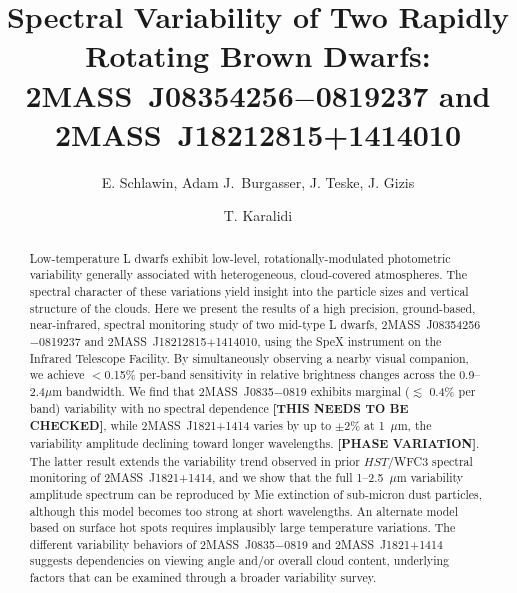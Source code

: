\documentclass[twocolumn]{aastex6}
\begin{document}
\title{Spectral Variability of Two Rapidly Rotating Brown Dwarfs: \\2MASS~J08354256$-$0819237 and 2MASS~J18212815+1414010}


\author{E. Schlawin, Adam J.\ Burgasser, J. Teske, J. Gizis \and T. Karalidi}



\begin{abstract}
Low-temperature L dwarfs exhibit low-level, rotationally-modulated photometric variability generally associated with heterogeneous, cloud-covered atmospheres. The spectral character of these variations yield insight into the particle sizes and vertical structure of the clouds. Here we present the results of a high precision, ground-based, near-infrared, spectral monitoring study of two mid-type L dwarfs, 2MASS~J08354256$-$0819237 and 2MASS~J18212815+1414010, using the SpeX instrument on the Infrared Telescope Facility. By simultaneously observing a nearby visual companion, we achieve $<$0.15\% per-band sensitivity in relative brightness changes across the 0.9--2.4$\mu$m bandwidth. We find that 2MASS~J0835$-$0819 exhibits marginal ($\lesssim$ 0.4\% per band) variability with no spectral dependence {\bf [THIS NEEDS TO BE CHECKED]}, while 2MASS~J1821+1414 varies by up to $\pm$2\% at 1~$\mu$m, the variability amplitude declining toward longer wavelengths.  {\bf [PHASE VARIATION]}. The latter result extends the variability trend observed in prior $HST$/WFC3 spectral monitoring of 2MASS~J1821+1414, and we show that the full 1--2.5~$\mu$m variability amplitude spectrum can be reproduced by Mie extinction of sub-micron dust particles, although this model becomes too strong at short wavelengths. An alternate model based on surface hot spots requires implausibly large temperature variations. The different variability behaviors of 2MASS~J0835$-$0819 and  2MASS~J1821+1414 suggests dependencies on viewing angle and/or overall cloud content, underlying factors that can be examined through a broader variability survey.
\end{abstract}
\end{document}
